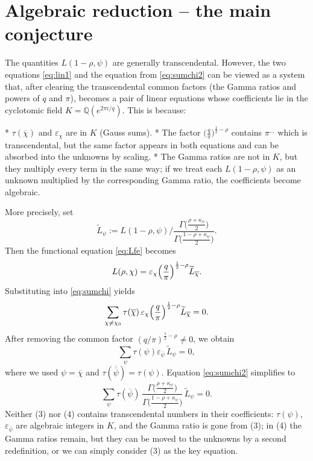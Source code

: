 \documentclass[12pt,a4paper]{article}
\theoremstyle{definition}
\begin{document}
\section{Algebraic reduction -- the main conjecture}
The quantities \(L(1-\rho,\psi)\) are generally transcendental.  However, the two equations \eqref{eq:lin1} and the equation from \eqref{eq:sumchi2} can be viewed as a system that, after clearing the transcendental common factors (the Gamma ratios and powers of \(q\) and \(\pi\)), becomes a pair of linear equations whose coefficients lie in the cyclotomic field \(K=\mathbb{Q}(e^{2\pi i/q})\).  This is because:

* \(\tau(\overline{\chi})\) and \(\varepsilon_\chi\) are in \(K\) (Gauss sums).
* The factor \(\bigl(\frac{q}{\pi}\bigr)^{\frac12-\rho}\) contains \(\pi^{...}\) which is transcendental, but the same factor appears in both equations and can be absorbed into the unknowns by scaling.
* The Gamma ratios are not in \(K\), but they multiply every term in the same way; if we treat each \(L(1-\rho,\psi)\) as an unknown multiplied by the corresponding Gamma ratio, the coefficients become algebraic.

More precisely, set
\[
\widetilde{L}_\psi := L(1-\rho,\psi)\Big/
      \frac{\Gamma\bigl(\frac{\rho+\kappa_\psi}{2}\bigr)}{\Gamma\bigl(\frac{1-\rho+\kappa_\psi}{2}\bigr)}.
\]
Then the functional equation \eqref{eq:Lfe} becomes
\[
L(\rho,\chi) = \varepsilon_\chi \Bigl(\frac{q}{\pi}\Bigr)^{\frac12-\rho} \widetilde{L}_{\overline{\chi}}.
\]
Substituting into \eqref{eq:sumchi} yields
\[
\sum_{\chi\neq\chi_0} \tau(\overline{\chi})\,
   \varepsilon_\chi \Bigl(\frac{q}{\pi}\Bigr)^{\frac12-\rho}
   \widetilde{L}_{\overline{\chi}} = 0.
\]
After removing the common factor \((q/\pi)^{\frac12-\rho}\neq0\), we obtain
\[
\sum_{\psi} \tau(\psi)\varepsilon_{\overline{\psi}} \,\widetilde{L}_{\psi} = 0,
\tag{3}
\]
where we used \(\psi=\overline{\chi}\) and \(\tau(\overline{\overline{\psi}})=\tau(\psi)\).  Equation \eqref{eq:sumchi2} simplifies to
\[
\sum_{\psi} \tau(\overline{\psi})\,
   \frac{\Gamma\bigl(\frac{\rho+\kappa_\psi}{2}\bigr)}{\Gamma\bigl(\frac{1-\rho+\kappa_\psi}{2}\bigr)}\,
   \widetilde{L}_\psi = 0.
\tag{4}
\]
Neither (3) nor (4) contains transcendental numbers in their coefficients: \(\tau(\psi)\), \(\varepsilon_{\overline{\psi}}\) are algebraic integers in \(K\), and the Gamma ratio is gone from (3); in (4) the Gamma ratios remain, but they can be moved to the unknowns by a second redefinition, or we can simply consider (3) as the key equation.
\end{document}
